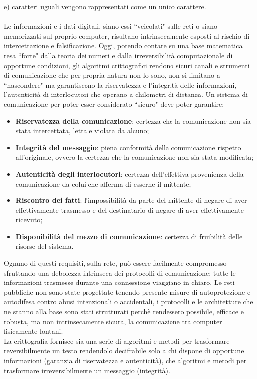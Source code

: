 \documentclass[a4paper,12pt]{tesiinfo}
\begin{document}
e) caratteri uguali vengono rappresentati come un unico carattere. 
\\
\\
Le informazioni e i dati digitali, siano essi ``veicolati" sulle reti o siano memorizzati sul proprio computer, risultano intrinsecamente esposti al rischio di intercettazione e falsificazione. Oggi, potendo contare su una base matematica resa ``forte" dalla teoria dei numeri e dalla irreversibilit\`a computazionale di opportune condizioni, gli algoritmi crittografici rendono sicuri canali e strumenti di comunicazione che per propria natura non lo sono, non si limitano a ``nascondere" ma garantiscono la riservatezza e l'integrit\`a delle informazioni, l'autenticit\`a di interlocutori che operano a chilometri di distanza. 
Un sistema di comunicazione per poter esser considerato ``sicuro" deve poter garantire:
 \begin{itemize}
  \item \textbf{Riservatezza della comunicazione}: certezza che la comunicazione non sia stata intercettata, letta e violata da alcuno;
  \item \textbf{Integrit\`a del messaggio}: piena conformit\`a della comunicazione rispetto all'originale, ovvero la certezza che la comunicazione non sia stata modificata;
  \item \textbf{Autenticit\`a degli interlocutori}: certezza dell'effettiva provenienza della comunicazione da colui che afferma di esserne il mittente;
  \item \textbf{Riscontro dei fatti}: l'impossibilit\`a da parte del mittente di negare di aver effettivamente trasmesso e del destinatario di negare di aver effettivamente ricevuto;
  \item \textbf{Disponibilit\`a del mezzo di comunicazione}: certezza di fruibilit\`a delle risorse del sistema.
 \end{itemize}
Ognuno di questi requisiti, sulla rete, pu\`o essere facilmente compromesso sfruttando una debolezza intrinseca dei protocolli di comunicazione: tutte le informazioni trasmesse durante una connessione viaggiano in chiaro. Le reti pubbliche non sono state progettate tenendo presente misure di autoprotezione e autodifesa contro abusi intenzionali o accidentali, i protocolli e le architetture che ne stanno alla base sono stati strutturati perch\`e rendessero possibile, efficace e robusta, ma non intrinsecamente sicura, la comunicazione tra computer fisicamente lontani. 
\\
La crittografia fornisce sia una serie di algoritmi e metodi per trasformare reversibilmente un testo rendendolo decifrabile solo a chi dispone di opportune informazioni (garanzia di riservatezza e autenticit\`a), che algoritmi e metodi per trasformare irreversibilmente un messaggio (integrit\`a). 
\end{document}
